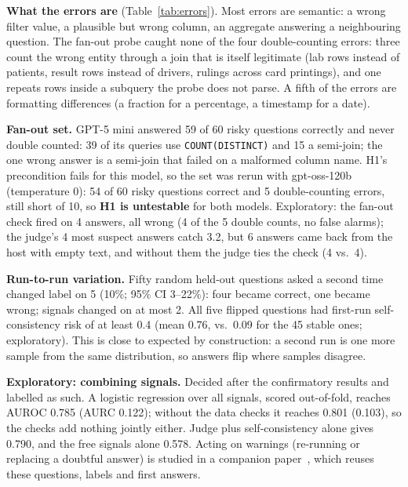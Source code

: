 \documentclass[conference]{IEEEtran}
\begin{document}
\textbf{What the errors are} (Table~\ref{tab:errors}). Most errors are semantic: a wrong filter
value, a plausible but wrong column, an aggregate answering a neighbouring question. The fan-out probe
caught none of the four double-counting errors: three count the wrong entity through a join that is
itself legitimate (lab rows instead of patients, result rows instead of drivers, rulings across card
printings), and one repeats rows inside a subquery the probe does not parse. A fifth of the errors are
formatting differences (a fraction for a percentage, a timestamp for a date).

\textbf{Fan-out set.} GPT-5 mini answered 59 of 60 risky questions correctly and never double
counted: 39 of its queries use \texttt{COUNT(DISTINCT)} and 15 a semi-join; the one wrong answer is a
semi-join that failed on a malformed column name. H1's precondition fails for this model, so the set
was rerun with gpt-oss-120b (temperature 0): 54 of 60 risky questions correct and 5 double-counting errors, still
short of 10, so \textbf{H1 is untestable} for both models. Exploratory: the fan-out check fired on 4
answers, all wrong (4 of the 5 double counts, no false alarms); the judge's 4 most suspect answers
catch 3.2, but 6 answers came back from the host with empty text, and without them the judge ties the
check (4 vs.\ 4).

\textbf{Run-to-run variation.} Fifty random held-out questions asked a second time changed label on 5
(10\%; 95\% CI 3--22\%): four became correct, one became wrong; signals changed on at most 2. All five
flipped questions had first-run self-consistency risk of at least 0.4 (mean 0.76, vs.\ 0.09 for the
45 stable ones; exploratory). This is close to expected by construction: a second run is one more
sample from the same distribution, so answers flip where samples disagree.

\textbf{Exploratory: combining signals.} Decided after the confirmatory results and labelled as such.
A logistic regression over all signals, scored out-of-fold, reaches AUROC 0.785 (AURC 0.122); without
the data checks it reaches 0.801 (0.103), so the checks add nothing jointly either. Judge plus
self-consistency alone gives 0.790, and the free signals alone 0.578. Acting on warnings (re-running or
replacing a doubtful answer) is studied in a companion paper~\cite{companion2026decisions}, which reuses these
questions, labels and first answers.
\end{document}
